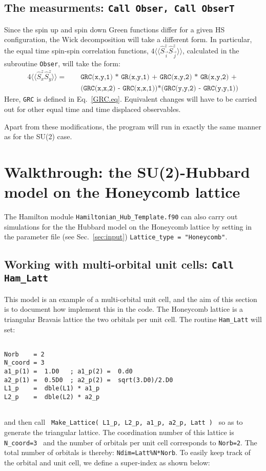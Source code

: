  \subsection{The  measurments: \texttt{Call Obser, Call  ObserT} } 
 Since  the spin up and spin down Green functions differ  for a given HS configuration,  the Wick decomposition will take a different form. In particular, the  equal time spin-spin correlation functions,
 $ 4 \langle \langle \hat{S}^{z}_{\vec{i}}   \hat{S}^{z}_{\vec{j}} \rangle \rangle   $, calculated in the subroutine  \texttt{Obser},  will take the form: 
  \begin{eqnarray}
   4 \langle \langle \hat{S}^{z}_{x}   \hat{S}^{z}_{y} \rangle \rangle   =  & &  \texttt{  GRC(x,y,1) * GR(x,y,1) + GRC(x,y,2) * GR(x,y,2) + }  \nonumber \\ 
& & \texttt{   (GRC(x,x,2) - GRC(x,x,1))*(GRC(y,y,2) - GRC(y,y,1))}  \nonumber
  \end{eqnarray}
  Here,  \texttt{GRC}  is defined in Eq.~\ref{GRC.eq}.  Equivalent changes will have to be carried out for other equal time and time displaced observables. 
  
  Apart from these modifications, the program  will run in exactly the same manner as for the SU(2) case. 
  
  
\section{Walkthrough: the SU(2)-Hubbard model on  the Honeycomb  lattice}\label{sec:walk1.2}
The Hamilton module \texttt{Hamiltonian\_Hub\_Template.f90}   can also carry out simulations for  the the Hubbard model on the Honeycomb lattice by setting in the parameter file  (see Sec.~\ref{sec:input})   \texttt{Lattice\_type = "Honeycomb"}.

\subsection{Working with multi-orbital unit cells:  \texttt{Call Ham\_Latt} }

  This model is an example of  a multi-orbital unit cell, and the aim of this section is to document how  implement this in the code.  The  Honeycomb lattice is a  triangular Bravais lattice the two orbitals per unit cell.  The routine  \texttt{Ham\_Latt} will set: 

\begin{lstlisting}

Norb    = 2
N_coord = 3
a1_p(1) =  1.D0   ; a1_p(2) =  0.d0
a2_p(1) =  0.5D0  ; a2_p(2) =  sqrt(3.D0)/2.D0             
L1_p    =  dble(L1) * a1_p
L2_p    =  dble(L2) * a2_p
            
\end{lstlisting}
and then  call \texttt{ Make\_Lattice( L1\_p, L2\_p, a1\_p,  a2\_p, Latt ) } so as to generate the triangular lattice.  The coordination number of this lattice is \texttt{ N\_coord=3 }  and  the number of orbitals per unit cell  corresponds to \texttt{Norb=2}.    The total number of  orbitals  is thereby: \texttt{Ndim=Latt\%N*Norb}.    To easily keep track of the orbital and unit cell, we define a  super-index as shown below:


